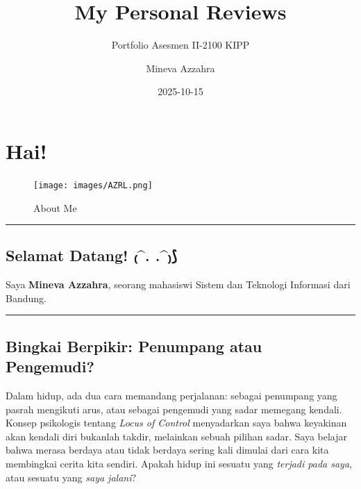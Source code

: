 \documentclass[
  letterpaper,
  DIV=11,
  numbers=noendperiod]{scrreprt}
\title{My Personal Reviews}
\subtitle{Portfolio Asesmen II-2100 KIPP}
\author{Mineva Azzahra}
\date{2025-10-15}
\renewcommand*\contentsname{Table of contents}
\newcommand\contentsname{Table of contents}
\begin{document}
\maketitle

\renewcommand*\contentsname{Table of contents}
{
\hypersetup{linkcolor=}
\setcounter{tocdepth}{2}
\tableofcontents
}


\chapter*{Hai!}\label{hai}


\begin{figure}[H]

{\centering \texttt{[image: images/AZRL.png]}

}

\caption{About Me}

\end{figure}%

\begin{center}\rule{0.5\linewidth}{0.5pt}\end{center}

\section*{Selamat Datang! ₍\^{}. .\^{}₎⟆}\label{selamat-datang-.-.}


Saya \textbf{Mineva Azzahra}, seorang mahasiswi Sistem dan Teknologi
Informasi dari Bandung.

\begin{center}\rule{0.5\linewidth}{0.5pt}\end{center}

\section*{Bingkai Berpikir: Penumpang atau
Pengemudi?}\label{bingkai-berpikir-penumpang-atau-pengemudi}


Dalam hidup, ada dua cara memandang perjalanan: sebagai penumpang yang
pasrah mengikuti arus, atau sebagai pengemudi yang sadar memegang
kendali. Konsep psikologis tentang \emph{Locus of Control} menyadarkan
saya bahwa keyakinan akan kendali diri bukanlah takdir, melainkan sebuah
pilihan sadar. Saya belajar bahwa merasa berdaya atau tidak berdaya
sering kali dimulai dari cara kita membingkai cerita kita sendiri.
Apakah hidup ini sesuatu yang \emph{terjadi pada saya}, atau sesuatu
yang \emph{saya jalani}?
\end{document}
